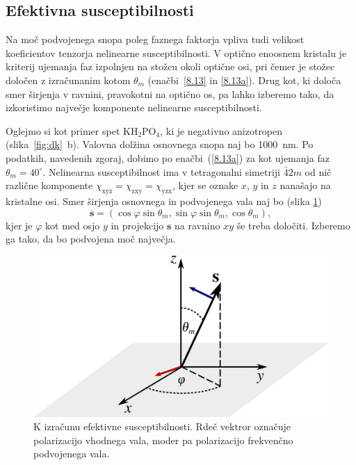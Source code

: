 \documentclass[11pt,fleqn]{book} %
\begin{document}
\subsection*{Efektivna susceptibilnosti}
Na moč podvojenega snopa poleg faznega faktorja vpliva tudi velikost koeficientov
tenzorja nelinearne susceptibilnosti. V optično enoosnem kristalu
je kriterij ujemanja faz izpolnjen na stožcu okoli optične osi, pri čemer je stožec določen 
z izračunanim kotom $\theta_m$ (enačbi~\ref{8.13} in \ref{8.13a}). 
Drug kot, ki določa smer širjenja v ravnini, pravokotni na optično os, pa 
lahko izberemo tako, da izkoristimo največje komponente nelinearne 
susceptibilnosti. 


Oglejmo si kot primer spet KH$_{2}$PO$_{4}$, ki je negativno anizotropen 
(slika~\ref{fig:dk}~b). Valovna dolžina osnovnega snopa naj bo 1000~nm. 
Po podatkih, navedenih zgoraj, dobimo po enačbi~(\ref{8.13a}) za kot ujemanja faz 
$\theta_m = 40^\circ$. Nelinearna susceptibilnost ima v tetragonalni
simetriji $\bar{4}2m$ od nič različne komponente $\chi_\textrm{xyz}=
\chi_\textrm{zxy}=\chi_\textrm{yzx}$,
kjer se oznake $x$, $y$ in $z$ nanašajo na kristalne osi. 
Smer
širjenja osnovnega in podvojenega vala naj bo (slika \ref{fig:chi})
\begin{equation}
\mathbf{s}=(\cos\varphi\sin\theta_m,\sin\varphi\sin\theta_m,\cos\theta_m),
\label{8.14}
\end{equation}
kjer je $\varphi$ kot med osjo $y$ in projekcijo $\mathbf{s}$ na ravnino
$xy$ še treba določiti. Izberemo ga tako, da bo podvojena moč največja.
\begin{figure}[h]
\centering
\includegraphics[width=6truecm]{slike/08_chi.png}
\caption{K izračunu efektivne susceptibilnosti. Rdeč vektror označuje
polarizacijo vhodnega vala, moder pa polarizacijo frekvenčno podvojenega vala. }
\label{fig:chi}
\end{figure}
\end{document}
